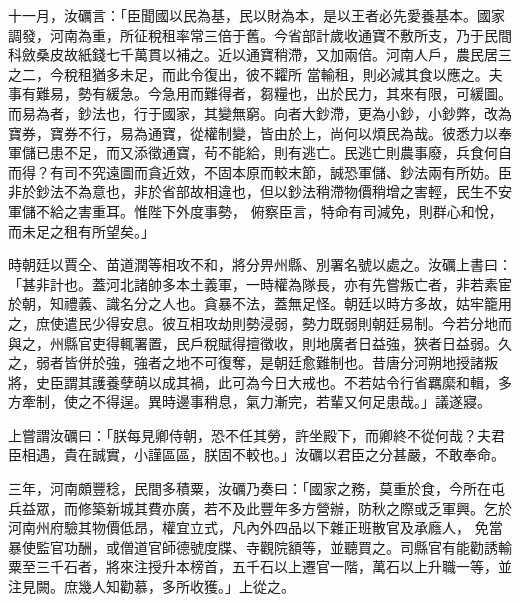 \begin{pinyinscope}
 十一月，汝礪言：「臣聞國以民為基，民以財為本，是以王者必先愛養基本。國家調發，河南為重，所征稅租率常三倍于舊。今省部計歲收通寶不敷所支，乃于民間科斂桑皮故紙錢七千萬貫以補之。近以通寶稍滯，又加兩倍。河南人戶，農民居三之二，今稅租猶多未足，而此令復出，彼不糶所
 當輸租，則必減其食以應之。夫事有難易，勢有緩急。今急用而難得者，芻糧也，出於民力，其來有限，可緩圖。而易為者，鈔法也，行于國家，其變無窮。向者大鈔滯，更為小鈔，小鈔弊，改為寶券，寶券不行，易為通寶，從權制變，皆由於上，尚何以煩民為哉。彼悉力以奉軍儲已患不足，而又添徵通寶，茍不能給，則有逃亡。民逃亡則農事廢，兵食何自而得？有司不究遠圖而貪近效，不固本原而較末節，誠恐軍儲、鈔法兩有所妨。臣非於鈔法不為意也，非於省部故相違也，但以鈔法稍滯物價稍增之害輕，民生不安軍儲不給之害重耳。惟陛下外度事勢，
 俯察臣言，特命有司減免，則群心和悅，而未足之租有所望矣。」



 時朝廷以賈仝、苗道潤等相攻不和，將分畀州縣、別署名號以處之。汝礪上書曰：「甚非計也。蓋河北諸帥多本土義軍，一時權為隊長，亦有先嘗叛亡者，非若素宦於朝，知禮義、識名分之人也。貪暴不法，蓋無足怪。朝廷以時方多故，姑牢籠用之，庶使遣民少得安息。彼互相攻劫則勢浸弱，勢力既弱則朝廷易制。今若分地而與之，州縣官吏得輒署置，民戶稅賦得擅徵收，則地廣者日益強，狹者日益弱。久之，弱者皆併於強，強者之地不可復奪，是朝廷愈難制也。昔唐分河朔地授諸叛
 將，史臣謂其護養孽萌以成其禍，此可為今日大戒也。不若姑令行省羈縻和輯，多方牽制，使之不得逞。異時邊事稍息，氣力漸完，若輩又何足患哉。」議遂寢。



 上嘗謂汝礪曰：「朕每見卿侍朝，恐不任其勞，許坐殿下，而卿終不從何哉？夫君臣相遇，貴在誠實，小謹區區，朕固不較也。」汝礪以君臣之分甚嚴，不敢奉命。



 三年，河南頗豐稔，民間多積粟，汝礪乃奏曰：「國家之務，莫重於食，今所在屯兵益眾，而修築新城其費亦廣，若不及此豐年多方營辦，防秋之際或乏軍興。乞於河南州府驗其物價低昂，權宜立式，凡內外四品以下雜正班散官及承廕人，
 免當暴使監官功酬，或僧道官師德號度牒、寺觀院額等，並聽買之。司縣官有能勸誘輸粟至三千石者，將來注授升本榜首，五千石以上遷官一階，萬石以上升職一等，並注見闕。庶幾人知勸慕，多所收獲。」上從之。




\end{pinyinscope}
